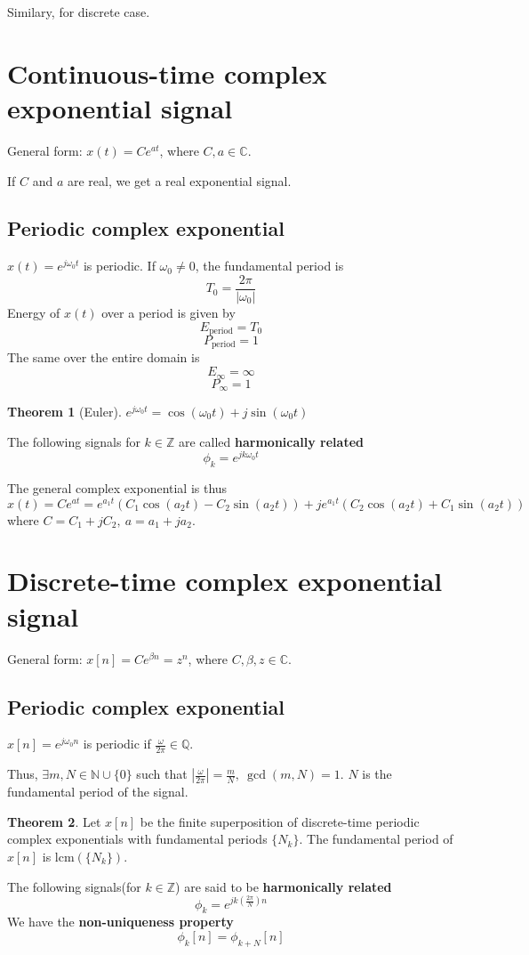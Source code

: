\documentclass[10pt, a4paper]{extarticle}
\theoremstyle{definition}
\newtheorem*{thm}{Theorem}
\begin{document}
	Similary, for discrete case.

	\section{Continuous-time complex exponential signal}
	General form: $x(t)=Ce^{at}$, where $C,a\in\mathbb{C}$.

	If $C$ and $a$ are real, we get a real exponential signal.
	\subsection{Periodic complex exponential}
	$x(t)=e^{j\omega_0 t}$ is periodic. If $\omega_0\neq 0$, the fundamental period is \[T_0=\frac{2\pi}{|\omega_0|}\] 
	Energy of $x(t)$ over a period is given by\[E_{\text{period}}=T_0\]
	\[P_{\text{period}}=1\]
	The same over the entire domain is
	\[E_\infty = \infty\]
	\[P_\infty = 1\]
	\begin{thm}[Euler]
		$e^{j\omega_0t}=\cos(\omega_0t)+j\sin(\omega_0t)$
	\end{thm}
	The following signals for $k\in \mathbb{Z}$ are called \textbf{harmonically related}
	\[\phi_k=e^{jk\omega_0 t}\]

	The general complex exponential is thus
	\[x(t)=Ce^{at}=e^{a_1 t}\left(C_1\cos(a_2 t)-C_2\sin(a_2 t)\right)+je^{a_1 t}\left(C_2\cos(a_2 t)+C_1\sin(a_2 t)\right)\]
	where $C=C_1+jC_2,\ a=a_1+ja_2$.

	\section{Discrete-time complex exponential signal}
	General form: $x[n]=Ce^{\beta n}=z^n$, where $C,\beta,z\in \mathbb{C}$.
	\subsection{Periodic complex exponential}
	$x[n]=e^{j\omega_0 n}$ is periodic if $\frac{\omega}{2\pi}\in\mathbb{Q}$. 

	Thus, $\exists m,N\in\mathbb{N}\cup\{0\}$ such that $|\frac{\omega}{2\pi}|=\frac{m}{N},\ \gcd(m,N)=1$. $N$ is the fundamental period of the signal.
	\begin{thm}
		Let $x[n]$ be the finite superposition of discrete-time periodic complex exponentials with fundamental periods $\{N_k\}$. The fundamental period of $x[n]$ is $\text{lcm}(\{N_k\})$.
	\end{thm}
	
	The following signals(for $k\in\mathbb{Z}$) are said to be \textbf{harmonically related}
	\[\phi_k=e^{jk\left(\frac{2\pi}{N}\right)n}\]
	We have the \textbf{non-uniqueness property}
	\[\phi_k[n]=\phi_{k+N}[n]\]
\end{document}
